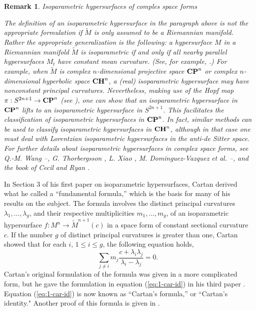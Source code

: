 \documentclass[12pt]{article}
\newtheorem{remark}{Remark}[section]
\begin{document}
\begin{remark}{Isoparametric hypersurfaces of comples space forms}
\label{rem-isop-complex-space-forms}

\noindent
{\rm The definition of an isoparametric hypersurface in the paragraph above is not the appropriate formulation if 
$\widetilde{M}$  is only assumed to be a Riemannian manifold.  Rather the appropriate generalization is the following: a hypersurface $M$ in a Riemannian manifold $\widetilde{M}$ is {\em isoparametric} if and only if all nearby parallel hypersurfaces $M_t$ have constant mean curvature.  (See, for example, \cite[pp. 526--531]{CR8}.)
For example, when $\widetilde{M}$ is complex $n$-dimensional projective space ${\bf CP}^n$ or complex
$n$-dimensional hyperbolic space ${\bf CH}^n$, a
(real) isoparametric hypersurface may have nonconstant principal curvatures.  Nevertheless, making use of the Hopf map $\pi: S^{2n+1} \rightarrow {\bf CP}^n$ (see \cite[p. 346]{CR8}), one can show that an isoparametric hypersurface in $ {\bf CP}^n$ lifts to an isoparametric hypersurface in $S^{2n+1}$.  This facilitates the classification of isoparametric hypersurfaces in  ${\bf CP}^n$.
In fact, similar methods can be used to classify isoparametric hypersurfaces in ${\bf CH}^n$, although in that case one
must deal with Lorentzian isoparametric hypersurfaces in the anti-de Sitter space.
For further details about isoparametric hypersurfaces in complex space forms, see 
Q.-M. Wang \cite{Wang-1a}--\cite{Wang3}, G. Thorbergsson \cite{Th7}, L. Xiao \cite{Xiao}, M. Dominguez-Vazquez et al. \cite{DV2}--\cite{DV3},
and the book of Cecil and Ryan \cite[343--531]{CR8}.}
\end{remark}


In Section 3 of his first paper on isoparametric hypersurfaces, Cartan \cite{Car1} derived what he called a
``fundamental formula,'' which is the basis for many of his results on the subject.
The formula involves  the distinct
principal curvatures $\lambda_1,\ldots,\lambda_g$, and their respective multiplicities $m_1,\ldots,m_g$, of an isoparametric
hypersurface $f:M^n \rightarrow \widetilde{M}^{n+1}(c)$ in a space form of constant sectional
curvature $c$.
If the number $g$ of distinct principal curvatures is greater than one, Cartan showed that for each $i$,
$1 \leq i \leq g$, the following equation holds,
\begin{equation}
\label{eq:1-car-id}
\sum_{j\neq i} m_j \frac{c + \lambda_i \lambda_j}{\lambda_i - \lambda_j} = 0.
\end{equation}
Cartan's original formulation of the formula was given in a more complicated form, but he gave the formulation in
equation (\ref{eq:1-car-id}) in his third paper \cite[p. 1484]{Car3}.  Equation (\ref{eq:1-car-id}) is now known as 
``Cartan's formula,''  or ``Cartan's identity."  Another proof of this formula is given in \cite[pp. 91--96]{CR8}.
\end{document}
